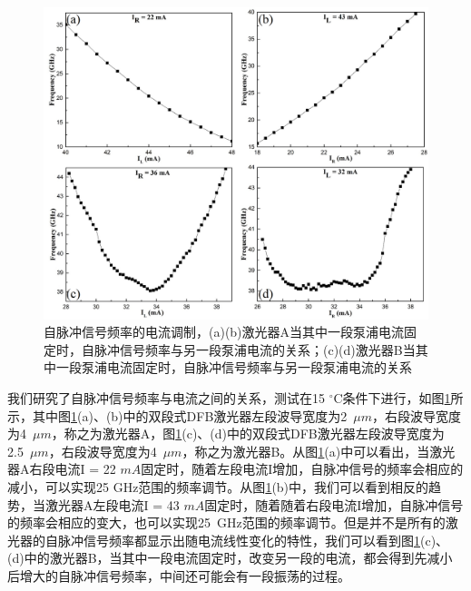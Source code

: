 \begin{figure}[htb]
	\centering
	\includegraphics[width=15cm]{./Pictures/laser_self_pulsation.jpg}
	\captionsetup{justification=centering}
	\caption{自脉冲信号频率的电流调制，(a)(b)激光器A当其中一段泵浦电流固定时，自脉冲信号频率与另一段泵浦电流的关系；(c)(d)激光器B当其中一段泵浦电流固定时，自脉冲信号频率与另一段泵浦电流的关系}
	\label{laser_self_pulsation}
\end{figure}

我们研究了自脉冲信号频率与电流之间的关系，测试在15 $^{\circ}$C条件下进行，如图\ref{laser_self_pulsation}所示，其中图\ref{laser_self_pulsation}(a)、(b)中的双段式DFB激光器左段波导宽度为2~$\mu m$，右段波导宽度为4~$\mu m$，称之为激光器A，图\ref{laser_self_pulsation}(c)、(d)中的双段式DFB激光器左段波导宽度为2.5~$\mu m$，右段波导宽度为4~$\mu m$，称之为激光器B。从图\ref{laser_self_pulsation}(a)中可以看出，当激光器A右段电流I = 22 $mA$固定时，随着左段电流I增加，自脉冲信号的频率会相应的减小，可以实现25 GHz范围的频率调节。从图\ref{laser_self_pulsation}(b)中，我们可以看到相反的趋势，当激光器A左段电流I = 43 $mA$固定时，随着随着右段电流I增加，自脉冲信号的频率会相应的变大，也可以实现25~GHz范围的频率调节。但是并不是所有的激光器的自脉冲信号频率都显示出随电流线性变化的特性，我们可以看到图\ref{laser_self_pulsation}(c)、(d)中的激光器B，当其中一段电流固定时，改变另一段的电流，都会得到先减小后增大的自脉冲信号频率，中间还可能会有一段振荡的过程。

